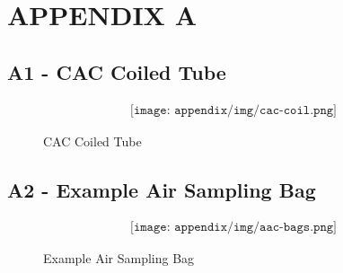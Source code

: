 
\section{APPENDIX A}
\subsection*{A1 - CAC Coiled Tube} \label{A}
\begin{figure}[H]
    \begin{align*}
        \texttt{[image: appendix/img/cac-coil.png]}
    \end{align*}
    \caption{CAC Coiled Tube}
    \label{fig:A1}
\end{figure}

\subsection*{A2 - Example Air Sampling Bag} \label{B}
\begin{figure}[H]
    \begin{align*}
        \texttt{[image: appendix/img/aac-bags.png]}
    \end{align*}
    \caption{Example Air Sampling Bag}
    \label{fig:A2}
\end{figure}